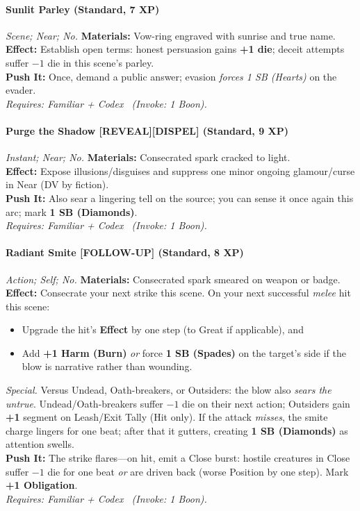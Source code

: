 \paragraph{Sunlit Parley (Standard, 7 XP)} \emph{Scene; Near; No.}
\textbf{Materials:} Vow-ring engraved with sunrise and true name.\\
\textbf{Effect:} Establish open terms: honest persuasion gains \textbf{+1 die}; deceit attempts suffer \(-1\) die in this scene’s parley.\\
\textbf{Push It:} Once, demand a public answer; evasion \emph{forces 1 SB (Hearts)} on the evader.\\
\emph{Requires: Familiar + Codex \ (\textit{Invoke:} 1 Boon).}

\paragraph{Purge the Shadow \textnormal{[REVEAL][DISPEL]} (Standard, 9 XP)} \emph{Instant; Near; No.}
\textbf{Materials:} Consecrated spark cracked to light.\\
\textbf{Effect:} Expose illusions/disguises and suppress one minor ongoing glamour/curse in Near (DV by fiction).\\
\textbf{Push It:} Also sear a lingering tell on the source; you can sense it once again this arc; mark \textbf{1 SB (Diamonds)}.\\
\emph{Requires: Familiar + Codex \ (\textit{Invoke:} 1 Boon).}

\paragraph{Radiant Smite \textnormal{[FOLLOW-UP] (Standard, 8 XP)}} \emph{Action; Self; No.}
\textbf{Materials:} Consecrated spark smeared on weapon or badge.\\
\textbf{Effect:} Consecrate your next strike this scene. On your next successful \emph{melee} hit this scene:
\begin{itemize}
  \item Upgrade the hit’s \textbf{Effect} by one step (to Great if applicable), and
  \item Add \textbf{+1 Harm (Burn)} \emph{or} force \textbf{1 SB (Spades)} on the target’s side if the blow is narrative rather than wounding.
\end{itemize}
\textit{Special.} Versus Undead, Oath-breakers, or Outsiders: the blow also \emph{sears the untrue}. Undead/Oath-breakers suffer \(-1\) die on their next action; Outsiders gain \textbf{+1} segment on Leash/Exit Tally (Hit only). If the attack \emph{misses}, the smite charge lingers for one beat; after that it gutters, creating \textbf{1 SB (Diamonds)} as attention swells.\\
\textbf{Push It:} The strike flares—on hit, emit a Close burst: hostile creatures in Close suffer \(-1\) die for one beat \emph{or} are driven back (worse Position by one step). Mark \textbf{+1 Obligation}.\\
\emph{Requires: Familiar + Codex \ (\textit{Invoke:} 1 Boon).}

